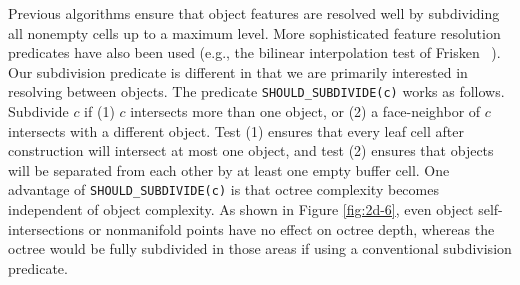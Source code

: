 \documentclass{egpubl}
\begin{document}


Previous algorithms ensure that object features are resolved well by subdividing all nonempty cells up to a maximum level.  More sophisticated feature resolution predicates have also been used (e.g., the bilinear interpolation test of Frisken \etal~). Our subdivision predicate is different in that we are primarily interested in resolving between objects.  The predicate \texttt{SHOULD\_SUBDIVIDE(c)} works as follows.  Subdivide $c$ if (1) $c$ intersects more than one object, or (2) a face-neighbor of $c$ intersects with a different object. Test (1) ensures that every leaf cell after construction will intersect at most one object, and test (2) ensures that objects will be separated from each other by at least one empty buffer cell.  One advantage of \texttt{SHOULD\_SUBDIVIDE(c)} is that octree complexity becomes independent of object complexity.  As shown in Figure \ref{fig:2d-6}, even object self-intersections or nonmanifold points have no effect on octree depth, whereas the octree would be fully subdivided in those areas if using a conventional subdivision predicate.
\end{document}
